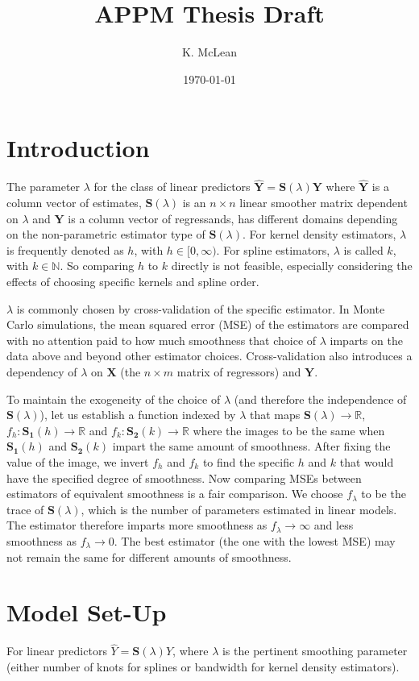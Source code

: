 \documentclass[a4paper, 11pt]{article}
\title{APPM Thesis Draft}
\author{K. McLean}
\date{\today}
\begin{document}
\maketitle

\section*{Introduction}

The parameter $\lambda$ for the class of linear predictors $\mathbf{\hat{Y}}=\mathbf{S}(\lambda)\mathbf{Y}$ where $\mathbf{\hat{Y}}$ is a column vector of estimates, $\mathbf{S}(\lambda)$ is an $n\times n$ linear smoother matrix dependent on $\lambda$ and $\mathbf{Y}$ is a column vector of regressands, has different domains depending on the non-parametric estimator type of $\mathbf{S}(\lambda)$. For kernel density estimators, $\lambda$ is frequently denoted as $h$, with $h \in [0,\infty)$. For spline estimators, $\lambda$ is called $k$, with $k \in \mathbb{N}$. So comparing $h$ to $k$ directly is not feasible, especially considering the effects of choosing specific kernels and spline order. 

$\lambda$ is commonly chosen by cross-validation of the specific estimator. In Monte Carlo simulations, the mean squared error (MSE) of the estimators are compared with no attention paid to how much smoothness that choice of $\lambda$ imparts on the data above and beyond other estimator choices. Cross-validation also introduces a dependency of $\lambda$ on $\mathbf{X}$ (the $n \times m$ matrix of regressors) and $\mathbf{Y}$.

To maintain the exogeneity of the choice of $\lambda$ (and therefore the independence of $\mathbf{S}(\lambda)$), let us establish a function indexed by $\lambda$ that maps $\mathbf{S}(\lambda)\rightarrow \mathbb{R}$, $f_h:\mathbf{S_1}(h)\rightarrow \mathbb{R}$ and $f_k:\mathbf{S_2}(k)\rightarrow \mathbb{R}$ where the images to be the same when $\mathbf{S_1}(h)$ and $\mathbf{S_2}(k)$ impart the same amount of smoothness. After fixing the value of the image, we invert $f_h$ and $f_k$ to find the specific $h$ and $k$ that would have the specified degree of smoothness. Now comparing MSEs between estimators of equivalent smoothness is a fair comparison. We choose $f_\lambda$ to be the trace of 
$\textbf{S}(\lambda)$, which is the number of parameters estimated in linear models. The estimator therefore imparts more smoothness as $f_\lambda \rightarrow \infty$ and less smoothness as $f_\lambda \rightarrow 0$. The best estimator (the one with the lowest MSE) may not remain the same for different amounts of smoothness.

\section*{Model Set-Up}

For linear predictors $\hat{Y} = \mathbf{S}(\lambda)Y$, where $\lambda$ is the pertinent smoothing parameter (either number of knots for splines or bandwidth for kernel density estimators).
\end{document}
